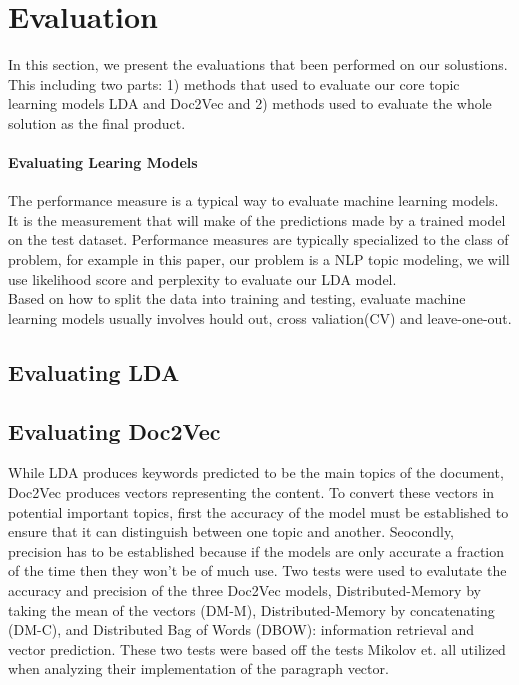 
\section{Evaluation}
In this section, we present the evaluations that been performed on our solustions. This including two parts: 1) methods that used to evaluate our core topic learning models LDA and Doc2Vec and 2) methods used to evaluate the whole solution as the final product. 
\paragraph{Evaluating Learing Models}
The performance measure is a typical way to evaluate machine learning models. It is the measurement that will make of the predictions made by a trained model on the test dataset. Performance measures are typically specialized to the class of problem, for example in this paper, our problem is a NLP topic modeling, we will use likelihood score and perplexity to evaluate our LDA model.\\
Based on how to split the data into training and testing, evaluate machine learning models usually involves hould out, cross valiation(CV) and leave-one-out. 

\subsection{Evaluating LDA}


\subsection{Evaluating Doc2Vec}
While LDA produces keywords predicted to be the main topics of the document, Doc2Vec produces vectors representing the content. To convert these vectors in potential important topics, first the accuracy of the model must be established to ensure that it can distinguish between one topic and another. Seocondly, precision has to be established because if the models are only accurate a fraction of the time then they won't be of much use. Two tests were used to evalutate the accuracy and precision of the three Doc2Vec models, Distributed-Memory by taking the mean of the vectors (DM-M), Distributed-Memory by concatenating (DM-C), and Distributed Bag of Words (DBOW): information retrieval and vector prediction. These two tests were based off the tests Mikolov et. all utilized when analyzing their implementation of the paragraph vector. \cite{RefWorks:doc:5a6e5746e4b0d609eec798d7}


